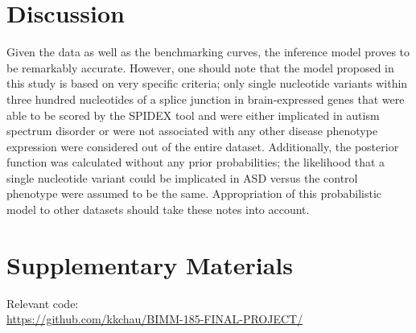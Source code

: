 \documentclass[12pt]{article}
\begin{document}
\pagebreak

\section{Discussion}
Given the data as well as the benchmarking curves, the inference model proves
to be remarkably accurate. However, one should note that the model proposed in
this study is based on very specific criteria; only single nucleotide variants
within three hundred nucleotides of a splice junction in brain-expressed genes
that were able to be scored by the SPIDEX tool and were either implicated in 
autism spectrum disorder or were not associated with any other disease 
phenotype expression were considered out of the 
entire dataset. Additionally, the posterior function was calculated without
any prior probabilities; the likelihood that a single nucleotide variant could
be implicated in ASD versus the control phenotype were assumed to be the same.
Appropriation of this probabilistic model to other datasets should take these
notes into account.

\section{Supplementary Materials}
Relevant code:\\
\href{https://github.com/kkchau/BIMM-185-FINAL-PROJECT/}{https://github.com/kkchau/BIMM-185-FINAL-PROJECT/}
\end{document}
